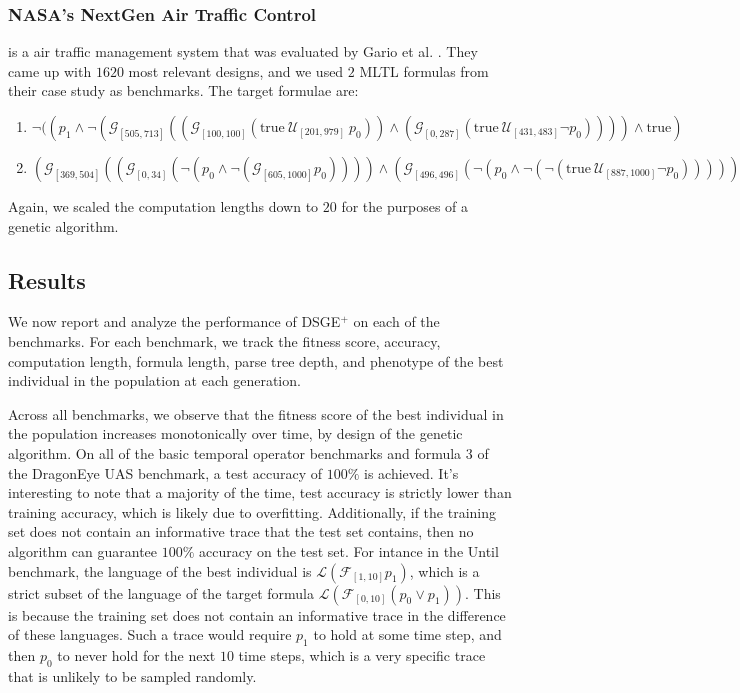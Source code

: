 \documentclass[runningheads]{llncs}
\begin{document}
\subsubsection{NASA's NextGen Air Traffic Control} is a air traffic management system that was evaluated by Gario et al. \cite{Gario_Cimatti_Mattarei_Tonetta_Rozier_2016}. 
They came up with $1620$ most relevant designs, and we used $2$ MLTL formulas from their case study as benchmarks. The target formulae are:
\begin{enumerate}
    \item $\neg ((p_1 \land \neg (\mathcal{G}_{[505, 713]} ((\mathcal{G}_{[100, 100]} (\text{true} \ \mathcal{U}_{[201, 979]} \ p_0)) \land (\mathcal{G}_{[0, 287]} (\text{true} \ \mathcal{U}_{[431, 483]} \neg p_0)))) \land \text{true})$
    \item $(\mathcal{G}_{[369, 504]} ((\mathcal{G}_{[0, 34]} (\neg (p_0 \land \neg (\mathcal{G}_{[605, 1000]} p_0)))) \land (\mathcal{G}_{[496, 496]} (\neg (p_0 \land \neg (\neg (\text{true} \ \mathcal{U}_{[887, 1000]} \neg p_0)))))) \land \text{true})$
\end{enumerate}
Again, we scaled the computation lengths down to $20$ for the purposes of a genetic algorithm.

\subsection{Results}
We now report and analyze the performance of DSGE$^+$ on each of the benchmarks.
For each benchmark, we track the fitness score, accuracy, computation length, formula length, parse tree depth, and phenotype of the best individual in the population at each generation.

Across all benchmarks, we observe that the fitness score of the best individual in the population increases monotonically over time, by design of the genetic algorithm.
On all of the basic temporal operator benchmarks and formula $3$ of the DragonEye UAS benchmark, a test accuracy of $100\%$ is achieved. 
It's interesting to note that a majority of the time, test accuracy is strictly lower than training accuracy, which is likely due to overfitting.
Additionally, if the training set does not contain an informative trace that the test set contains, then no algorithm can guarantee $100\%$ accuracy on the test set.
For intance in the Until benchmark, the language of the best individual is $\mathcal{L}(\mathcal{F}_{[1, 10]} p_1)$, which is a strict subset of the language of the target formula $\mathcal{L}(\mathcal{F}_{[0, 10]} (p_0 \lor p_1))$. 
This is because the training set does not contain an informative trace in the difference of these languages. 
Such a trace would require $p_1$ to hold at some time step, and then $p_0$ to never hold for the next $10$ time steps, which is a very specific trace that is unlikely to be sampled randomly.
\end{document}
